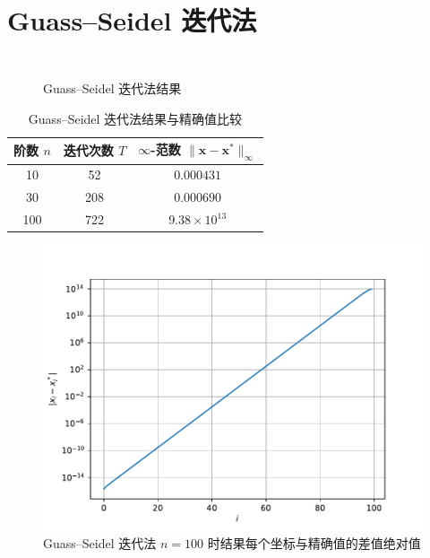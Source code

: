 \documentclass{sjtuarticle}
\begin{document}
\section{Guass--Seidel 迭代法}
\label{sec:gs}

\inputminted[firstline=186,lastline=211,highlightlines=201-204]{python3}{main.py}
\vspace*{-0.6cm}
\begin{minipage}{0.5\textwidth}
    \begin{figure}[H]
        \centering
        \inputminted[firstline=133,lastline=170,fontsize=\tiny]{text}{stdout.txt}
        \caption{Guass--Seidel 迭代法结果}
    \end{figure}
\end{minipage}
\begin{minipage}{0.45\textwidth}
    \begin{table}[H]
        \centering
        \caption{Guass--Seidel 迭代法结果与精确值比较}
        \begin{tabular}{ccc}
            \toprule
            阶数 $n$ & 迭代次数 $T$ & $\infty$-范数 $\lVert \bm{x}-\bm{x}^* \rVert_\infty$ \\
            \midrule
            10 & 52   & $0.000431$          \\
            30 & 208  & $0.000690$          \\
            100 & 722 & $9.38\times 10^{13}$\\
            \bottomrule
        \end{tabular}
    \end{table}
    \vspace*{-0.75cm}
    \begin{figure}[H]
        \centering
        \includegraphics[width=\textwidth]{pic/GuassSeidelSolver.pdf}
        \caption{Guass--Seidel 迭代法 $n=100$ 时结果每个坐标与精确值的差值绝对值}
    \end{figure}
\end{minipage}
\end{document}
